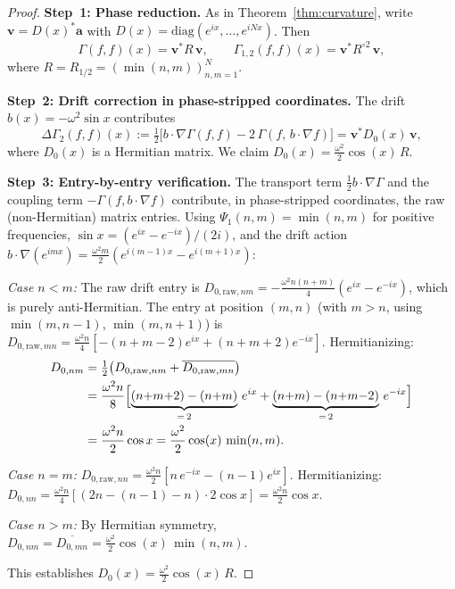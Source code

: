 \documentclass[11pt,a4paper]{article}
\theoremstyle{plain}
\theoremstyle{definition}
\theoremstyle{remark}
\begin{document}
\begin{proof}
\textbf{Step~1: Phase reduction.}
As in Theorem~\ref{thm:curvature}, write $\mathbf{v} = D(x)^*\mathbf{a}$
with $D(x) = \mathrm{diag}(e^{ix},\ldots,e^{iNx})$.  Then
\[
  \Gamma(f,f)(x) = \mathbf{v}^* R\,\mathbf{v}, \qquad
  \Gamma_{1,2}(f,f)(x) = \mathbf{v}^* R^{\circ 2}\,\mathbf{v},
\]
where $R = R_{1/2} = (\min(n,m))_{n,m=1}^N$.

\textbf{Step~2: Drift correction in phase-stripped coordinates.}
The drift $b(x) = -\omega^2\sin x$ contributes
\[
  \Delta\Gamma_2(f,f)(x) := \tfrac{1}{2}\bigl[
    b\cdot\nabla\Gamma(f,f) - 2\,\Gamma(f,\,b\cdot\nabla f)
  \bigr]
  = \mathbf{v}^* D_0(x)\,\mathbf{v},
\]
where $D_0(x)$ is a Hermitian matrix.  We claim
$D_0(x) = \tfrac{\omega^2}{2}\cos(x)\,R$.

\textbf{Step~3: Entry-by-entry verification.}
The transport term $\frac{1}{2}b\cdot\nabla\Gamma$ and the
coupling term $-\Gamma(f,b\cdot\nabla f)$ contribute, in
phase-stripped coordinates, the raw (non-Hermitian) matrix entries.
Using $\Psi_1(n,m) = \min(n,m)$ for positive frequencies,
$\sin x = (e^{ix}-e^{-ix})/(2i)$, and the drift action
$b\cdot\nabla(e^{imx}) = \frac{\omega^2 m}{2}(e^{i(m-1)x}-e^{i(m+1)x})$:

\emph{Case $n < m$:}
The raw drift entry is
$D_{0,\mathrm{raw},nm} = -\frac{\omega^2 n(n+m)}{4}(e^{ix}-e^{-ix})$,
which is purely anti-Hermitian.
The entry at position $(m,n)$ (with $m > n$, using
$\min(m,n{-}1)$, $\min(m,n{+}1)$) is
$D_{0,\mathrm{raw},mn}
= \frac{\omega^2 n}{4}[-(n{+}m{-}2)e^{ix}+(n{+}m{+}2)e^{-ix}]$.
Hermitianizing:
\begin{align*}
  D_{0,nm}
  &= \tfrac{1}{2}\bigl(D_{0,\mathrm{raw},nm}
     + \overline{D_{0,\mathrm{raw},mn}}\bigr) \\
  &= \frac{\omega^2 n}{8}\Bigl[
    \underbrace{(n{+}m{+}2)-(n{+}m)}_{=\,2}\,e^{ix}
    +\underbrace{(n{+}m)-(n{+}m{-}2)}_{=\,2}\,e^{-ix}
  \Bigr] \\
  &= \frac{\omega^2 n}{2}\cos x
  = \frac{\omega^2}{2}\cos(x)\,\min(n,m).
\end{align*}

\emph{Case $n = m$:}
$D_{0,\mathrm{raw},nn}
= \frac{\omega^2 n}{2}[n\,e^{-ix}-(n{-}1)e^{ix}]$.
Hermitianizing:
$D_{0,nn}
= \frac{\omega^2 n}{4}[(2n{-}(n{-}1){-}n)\cdot 2\cos x]
= \frac{\omega^2 n}{2}\cos x$.

\emph{Case $n > m$:}  By Hermitian symmetry, $D_{0,nm} = \overline{D_{0,mn}}
= \frac{\omega^2}{2}\cos(x)\,\min(n,m)$.

This establishes $D_0(x) = \frac{\omega^2}{2}\cos(x)\,R$.


\end{proof}
\end{document}
